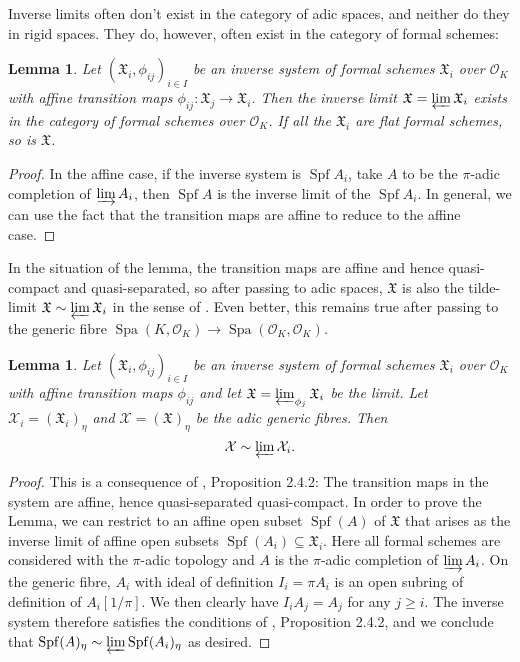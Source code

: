 \documentclass[10pt,oneside]{amsart}
\newtheorem{lemma}[theorem]{Lemma}
\theoremstyle{definition}
\theoremstyle{remark}
\begin{document}
	Inverse limits often don't exist in the category of adic spaces, and neither do they in rigid spaces. They do, however, often exist in the category of formal schemes:
	\begin{lemma}
		Let $(\mathfrak X_i,\phi_{ij})_{i\in I}$ be an inverse system of formal schemes $\mathfrak X_i$ over $\mathcal O_K$ with affine transition maps $\phi_{ij}:\mathfrak X_j\rightarrow \mathfrak X_i$. Then the inverse limit $\mathfrak X=\varprojlim \mathfrak X_i$ exists in the category of formal schemes over $\mathcal O_K$. If all the $\mathfrak X_i$ are flat formal schemes, so is $\mathfrak X$.
	\end{lemma}
	\begin{proof}
	In the affine case, if the inverse system is $\operatorname{Spf} A_i$, take $A$ to be the $\pi$-adic completion of $\varinjlim A_i$, then  $\operatorname{Spf} A$ is the inverse limit of the $\operatorname{Spf}A_i$. In general, we can use the fact that the transition maps are affine to reduce to the affine case. 
	\end{proof}
	In the situation of the lemma,  the transition maps are affine and hence quasi-compact and quasi-separated, so after passing to adic spaces, $\mathfrak X$ is also the tilde-limit  $\mathfrak X\sim \varprojlim \mathfrak X_i$ in the sense of \cite{SW}. Even better, this remains true after passing to the generic fibre $\operatorname{Spa}(K,\mathcal O_K)\rightarrow \operatorname{Spa}(\mathcal O_K,\mathcal O_K)$.
	\begin{lemma}\label{tilde-limit from adic generic fibre of formal schemes}
		Let $(\mathfrak X_i,\phi_{ij})_{i\in I}$ be an inverse system of formal schemes $\mathfrak X_i$ over $\mathcal O_K$ with affine transition maps $\phi_{ij}$ and let $\mathfrak X=\varprojlim_{\phi_j} \mathfrak X_i$ be the limit. Let $\mathcal X_i =(\mathfrak X_i)_\eta$ and  $\mathcal X = (\mathfrak X)_\eta$ be the adic generic fibres. Then
		\[\mathcal X \sim \varprojlim \mathcal X_i.\]
	\end{lemma}
	\begin{proof}
		This is a consequence of \cite{SW}, Proposition 2.4.2: The transition maps in the system are affine, hence quasi-separated quasi-compact. In order to prove the Lemma, we can restrict to an affine open subset $\operatorname{Spf}(A)$ of $\mathfrak X$ that arises as the inverse limit of affine open subsets $\operatorname{Spf}(A_i)\subseteq \mathfrak X_i$. Here all formal schemes are considered with the $\pi$-adic topology and $A$ is the $\pi$-adic completion of $\varinjlim A_i$. 
		On the generic fibre, $A_i$ with ideal of definition $I_i=\pi A_i$ is an open subring of definition of $A_i[1/\pi]$. We then clearly have $I_iA_j = A_j$ for any $j\geq i$. The inverse system therefore satisfies the conditions of \cite{SW}, Proposition 2.4.2, and we conclude that $\operatorname{Spf}(A)_\eta \sim \varprojlim \operatorname{Spf}(A_i)_\eta$ as desired.
	\end{proof}
	
\end{document}
